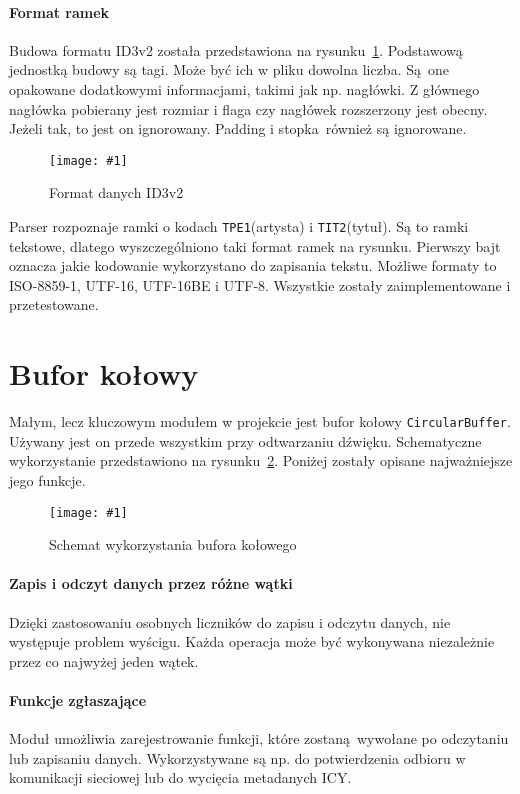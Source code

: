 \documentclass[polish]{aghengthesis}
\newcommand{\imgint}[4]{
	\begin{figure}[{#4}]
		\centering
		\texttt{[image: \#1]}
		\caption{#2}
		\label{#1}
	\end{figure}
}
\newcommand{\imgh}[3]{\imgint{#1}{#2}{#3}{H}}
\begin{document}
			\paragraph{Format ramek}
			Budowa formatu ID3v2 została przedstawiona na rysunku~\ref{3/PicoRadio-id3}. Podstawową jednostką budowy są tagi. Może być ich w pliku dowolna liczba. Są one opakowane dodatkowymi informacjami, takimi jak np. nagłówki. Z głównego nagłówka pobierany jest rozmiar i flaga czy nagłówek rozszerzony jest obecny. Jeżeli tak, to jest on ignorowany. Padding i stopka również są ignorowane.
			
			\imgh{3/PicoRadio-id3}{Format danych ID3v2}{0.8}
			
			Parser rozpoznaje ramki o kodach \lstinline|TPE1|(artysta) i \lstinline|TIT2|(tytuł). Są to ramki tekstowe, dlatego wyszczególniono taki format ramek na rysunku. Pierwszy bajt oznacza jakie kodowanie wykorzystano do zapisania tekstu. Możliwe formaty to ISO-8859-1, UTF-16, UTF-16BE i UTF-8. Wszystkie zostały zaimplementowane i przetestowane.
	
	\section{Bufor kołowy}
		\label{sec:circular_buffer}
		Małym, lecz kluczowym modułem w projekcie jest bufor kołowy \lstinline|CircularBuffer|. Używany jest on przede wszystkim przy odtwarzaniu dźwięku. Schematyczne wykorzystanie przedstawiono na rysunku~\ref{3/PicoRadio-buffer}. Poniżej zostały opisane najważniejsze jego funkcje.
		
		\imgh{3/PicoRadio-buffer}{Schemat wykorzystania bufora kołowego}{0.8}
		
		\paragraph{Zapis i odczyt danych przez różne wątki}
			Dzięki zastosowaniu osobnych liczników do zapisu i odczytu danych, nie występuje problem wyścigu. Każda operacja może być wykonywana niezależnie przez co najwyżej jeden wątek.
			
		\paragraph{Funkcje zgłaszające}
			Moduł umożliwia zarejestrowanie funkcji, które zostaną wywołane po odczytaniu lub zapisaniu danych. Wykorzystywane są np. do potwierdzenia odbioru w komunikacji sieciowej lub do wycięcia metadanych ICY.
		
\end{document}
